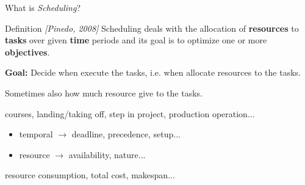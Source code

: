 \begin{frame}{What is {\it Scheduling}?}
  \vspace{0.3cm}
  \begin{block}{Definition {\small \it \color{blue!50!black!50}[Pinedo, 2008]}}
    Scheduling deals with the allocation of {\bf resources} to {\bf tasks} over
    given \textbf{time} periods and its goal is to optimize one or more \textbf{objectives}.
  \end{block}
\pause
  \vspace{0.3cm}
  {\bf Goal:} Decide when execute the tasks, i.e. when allocate resources
  to the tasks.
\pause
\vspace{0.3cm}

  Sometimes also how much resource give to the tasks.
  \vspace{0.5cm}
 {\small  \begin{description}[constraints :]
    \pause
  \item[tasks :]  courses, landing/taking off, step in project,
    production operation... 
    \pause
  \item[constraints :]
    \begin{itemize}
    \item temporal $\rightarrow$ deadline, precedence, setup...
    \item resource $\rightarrow$ availability, nature... 
    \end{itemize}
    \pause
  \item[objective :] resource consumption, total cost, makespan...
  \end{description}}
\vfill
\end{frame}


